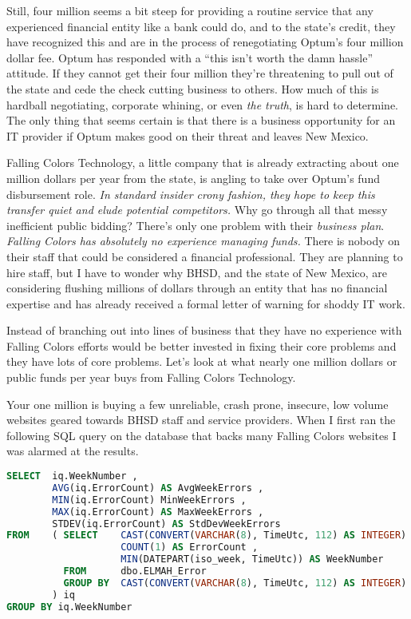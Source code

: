 Still, four million seems a bit steep for providing a routine service
that any experienced financial entity like a bank could do, and to the
state's credit, they have recognized this and are in the process of
renegotiating Optum's four million dollar fee. Optum has responded with
a ``this isn't worth the damn hassle'' attitude. If they cannot get
their four million they're threatening to pull out of the state and cede
the check cutting business to others. How much of this is hardball
negotiating, corporate whining, or even \emph{the truth}, is hard to
determine. The only thing that seems certain is that there is a business
opportunity for an IT provider if Optum makes good on their threat and
leaves New Mexico.

Falling Colors Technology, a little company that is already extracting
about one million dollars per year from the state, is angling to take
over Optum's fund disbursement role. \emph{In standard insider crony
fashion, they hope to keep this transfer quiet and elude potential
competitors.} Why go through all that messy inefficient public bidding?
There's only one problem with their \emph{business plan}. \emph{Falling
Colors has absolutely no experience managing funds.} There is nobody on
their staff that could be considered a financial professional. They are
planning to hire staff, but I have to wonder why BHSD, and the state of
New Mexico, are considering flushing millions of dollars through an
entity that has no financial expertise and has already received a formal
letter of warning for shoddy IT work.

Instead of branching out into lines of business that they have no
experience with Falling Colors efforts would be better invested in
fixing their core problems and they have lots of core problems. Let's
look at what nearly one million dollars or public funds per year buys
from Falling Colors Technology.

Your one million is buying a few unreliable, crash prone, insecure, low
volume websites geared towards BHSD staff and service providers. When I
first ran the following SQL query on the database that backs many
Falling Colors websites I was alarmed at the results.

\begin{tcolorbox}[breakable, size=fbox, boxrule=1pt, pad at break*=1mm,colback=cellbackground, colframe=cellborder]
\begin{lstlisting}[language=SQL,frame=single,framerule=0pt,label=lst:scr5261X0]
SELECT  iq.WeekNumber ,
        AVG(iq.ErrorCount) AS AvgWeekErrors ,
        MIN(iq.ErrorCount) MinWeekErrors ,
        MAX(iq.ErrorCount) AS MaxWeekErrors ,
        STDEV(iq.ErrorCount) AS StdDevWeekErrors
FROM    ( SELECT    CAST(CONVERT(VARCHAR(8), TimeUtc, 112) AS INTEGER) AS DayNumber ,
                    COUNT(1) AS ErrorCount ,
                    MIN(DATEPART(iso_week, TimeUtc)) AS WeekNumber
          FROM      dbo.ELMAH_Error
          GROUP BY  CAST(CONVERT(VARCHAR(8), TimeUtc, 112) AS INTEGER)
        ) iq
GROUP BY iq.WeekNumber
\end{lstlisting}
\end{tcolorbox}

